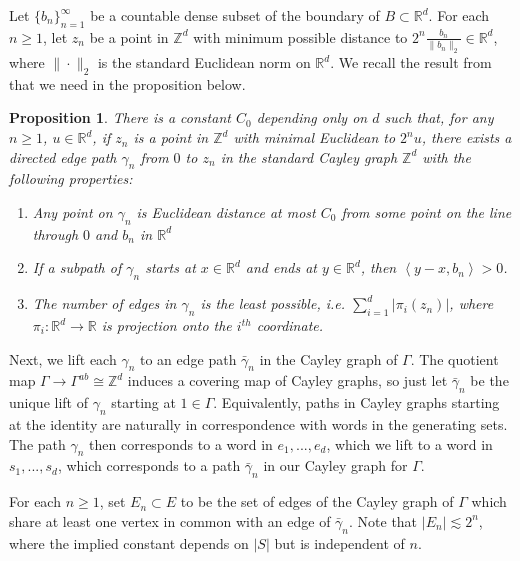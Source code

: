 \documentclass[12pt,reqno]{article}
\numberwithin{equation}{section}
\newcommand{\R}{\mathbb{R}}
\newcommand{\Z}{\mathbb{Z}}
\newcommand{\pair}[2]{\left\langle #1, #2 \right\rangle}
\newtheorem{prop}{Proposition}
\begin{document}
 Let $\{b_n\}_{n=1}^{\infty}$ be a countable dense subset of the boundary of $B \subset \R^d$. For each $n \ge 1$,
 let $z_n$ be a point in $\Z^d$ with minimum possible distance to $2^n \frac{b_n}{\| b_n \|_2} \in \R^d$, where $\| \cdot \|_2$
 is the standard Euclidean norm on $\R^d$. We recall the result from \cite{HaggstromMeester} that we need in the proposition below.
 \begin{prop} \label{pathsprop}
 There is a constant $C_0$ depending only on $d$ such that, for any $n \ge 1$, $u \in \R^d$, if $z_n$ is a point in $\Z^d$ with minimal
 Euclidean to $2^n u$,
 there exists a directed edge path $\gamma_n$ from $0$ to $z_n$ in the standard Cayley graph $\Z^d$ with the following properties:
 \begin{enumerate}
\item Any point on $\gamma_n$ is Euclidean distance at most $C_0$ from some point on the line through $0$ and $b_n$ in $\R^d$
\item If a subpath of $\gamma_n$ starts at $x \in \R^d$ and ends at $y \in \R^d$, then $\pair{y-x}{b_n} > 0$.
\item The number of edges in $\gamma_n$ is the least possible, i.e. $\sum_{i=1}^d |\pi_i (z_n) |$, where $\pi_i: \R^d \to \R$
is projection onto the $i^{th}$ coordinate.
\end{enumerate}
 \end{prop}

Next, we lift each $\gamma_n$ to an edge path $\bar{\gamma}_n$ in the Cayley graph of $\Gamma$. The
quotient map $\Gamma \to \Gamma^{ab} \cong \Z^d$ induces a covering map of Cayley graphs, 
so just let $\bar{\gamma}_n$ be the unique lift of $\gamma_n$ starting at
$1 \in \Gamma$. Equivalently, paths in Cayley graphs starting at the identity are naturally in correspondence with words in the
generating sets. The path $\gamma_n$ then corresponds to a word in $e_1,...,e_d$, which we lift to a word in $s_1,...,s_d$,
which corresponds to a path $\bar{\gamma}_n$ in our Cayley graph for $\Gamma$.

For each $n \ge 1$, set $E_n \subset E$ to be the set of edges of the Cayley graph of $\Gamma$ which share at least one
vertex in common with an edge of $\bar{\gamma}_n$. Note that $|E_n| \lesssim 2^n$, where the implied constant depends on $|S|$
but is independent of $n$.
\end{document}
